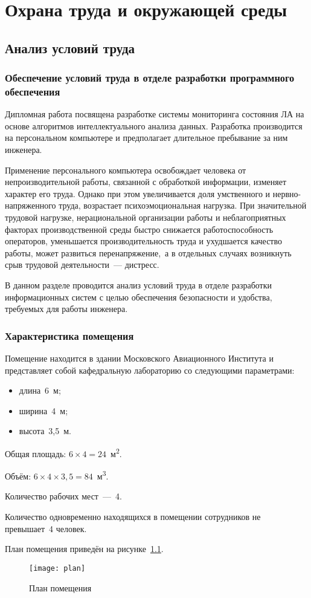\chapter{Охрана труда и окружающей среды}
\section{Анализ условий труда}
\subsection{Обеспечение условий труда в отделе разработки программного обеспечения}
Дипломная работа посвящена разработке системы мониторинга состояния ЛА на основе алгоритмов интеллектуального анализа данных. Разработка производится на персональном компьютере и предполагает длительное пребывание за ним инженера.

Применение персонального компьютера освобождает человека от непроизводительной работы, связанной с обработкой информации, изменяет характер его труда. Однако при этом увеличивается доля умственного и нервно-напряженного труда, возрастает психоэмоциональная нагрузка. При значительной трудовой нагрузке, нерациональной организации работы и неблагоприятных факторах производственной среды быстро снижается работоспособность операторов, уменьшается производительность труда и ухудшается качество работы, может развиться перенапряжение,~а в отдельных случаях возникнуть срыв трудовой деятельности~— дистресс.

В данном разделе проводится анализ условий труда в отделе разработки информационных систем с целью обеспечения безопасности и удобства, требуемых для работы инженера.

\subsection{Характеристика помещения}
Помещение находится в здании Московского Авиационного Института и представляет собой кафедральную лабораторию со следующими параметрами:
\begin{itemize}
	\item длина~6~м;
	\item ширина~4~м;
	\item высота~3,5~м.
\end{itemize}

Общая площадь: $6\times4 = 24$~м\textsuperscript{2}.

Объём: $6\times4\times3,5 = 84$~м\textsuperscript{3}.

Количество рабочих мест~—~4.

Количество одновременно находящихся в помещении сотрудников не превышает~4 человек.

План помещения приведён на рисунке~\ref{image:room_plan}.
\begin{figure}[h]
\texttt{[image: plan]}
\caption{План помещения}\label{image:room_plan}
\end{figure}